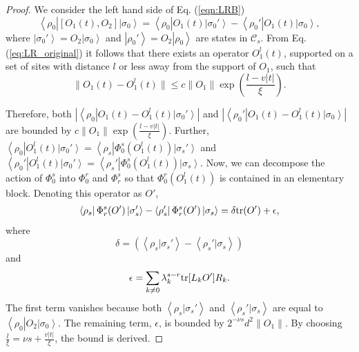 \documentclass[a4paper,11pt]{article}
\newcommand{\bra}[1]{\left\langle #1 \right|}
\newcommand{\ket}[1]{\left|#1\right\rangle}
\newcommand{\braket}[2]{\left\langle#1 |  #2\right\rangle}
\newcommand{\1}{\mathbbm{1}}
\newcommand{\cC}{\mathcal{C}}
\newcommand{\tr}{{\rm tr}}
\begin{document}
\begin{proof}
We consider the left hand side of Eq. (\ref{eqn:LRB})
\begin{equation}
\bra{\rho_0} [O_1(t),O_2] \ket{\sigma_0} = \bra{\rho_0}O_1(t)\ket{\sigma_0'} - \bra{\rho_0'}O_1(t)\ket{\sigma_0},\nonumber
\end{equation}
where $\ket{\sigma_0'} = O_2\ket{\sigma_0}$ and $\ket{\rho_0'}=O_2\ket{\rho_0}$ are states in $\cC_s$. From Eq. (\ref{eq:LR_original}) it follows that there exists an operator $O_1^l(t)$, supported on a set of sites with distance $l$ or less away from the support of $O_1$, such that \cite{Bravyi2006}
\begin{equation}
\|O_1(t) - O_1^l(t) \|\leq c \| O_1 \| \exp(\frac{l-v|t|}{\xi}).
\end{equation}

Therefore, both $|\bra{\rho_0} O_1(t) - O_1^l(t)\ket{\sigma_0'}|$ and $|\bra{\rho_0'} O_1(t) - O_1^l(t)\ket{\sigma_0}|$ are bounded by $c\| O_1\|  \exp(\frac{l-v|t|}{\xi})$. Further,  $\bra{\rho_0} O_1^l(t)\ket{\sigma_0'}=\bra{\rho_s} \Phi_0^s(O_1^l(t))\ket{\sigma_s'}$ and  $\bra{\rho_0'} O_1^l(t)\ket{\sigma_0'}=\bra{\rho_s'} \Phi_0^s(O_1^l(t))\ket{\sigma_s}$. Now, we can decompose the action of $\Phi_0^s$ into $\Phi_0^r$ and $\Phi_r^s$ so that $\Phi_0^r(O_1^l(t))$ is contained in an elementary block. Denoting this operator as $O'$,
\begin{align}
\bra{\rho_s} \Phi_r^s(O') \ket{\sigma_s'} - \bra{\rho_s'} \Phi_r^s(O') \ket{\sigma_s} =\delta \tr(O') +\epsilon,
\end{align}
where
\begin{equation}
	\delta = (\braket{\rho_s}{\sigma_s'} - \braket{\rho_s'}{\sigma_s})
\end{equation}
and
\begin{equation}
\epsilon = \sum_{k\neq 0} \lambda_k^{s-r} \tr[L_kO'] R_k.
\end{equation}
The first term vanishes because both $\braket{\rho_s}{\sigma_s'}$ and $\braket{\rho_s'}{\sigma_s}$ are equal to $\bra{\rho_0} O_2\ket{\sigma_0}$. The remaining term, $\epsilon$, is bounded by $2^{-\nu s}d^2\|O_1\|$. By choosing $\frac{l}{\xi} = \nu s + \frac{v|t|}{\xi}$, the bound is derived.

\end{proof}

\end{document}
